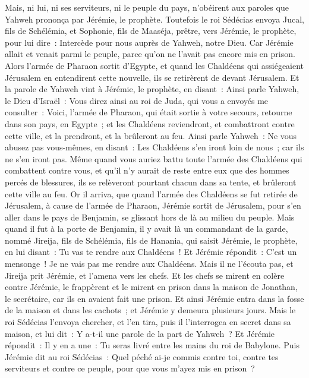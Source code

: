 \begin{multicols}{2}
Mais, ni lui, ni ses serviteurs, ni le peuple du pays, n'obéirent aux paroles que Yahweh prononça par Jérémie, le prophète.
Toutefois le roi Sédécias envoya Jucal, fils de Schélémia, et Sophonie, fils de Maaséja, prêtre, vers Jérémie, le prophète, pour lui dire~: Intercède pour nous auprès de Yahweh, notre Dieu.
Car Jérémie allait et venait parmi le peuple, parce qu'on ne l'avait pas encore mis en prison.
Alors l'armée de Pharaon sortit d'Egypte, et quand les Chaldéens qui assiégeaient Jérusalem en entendirent cette nouvelle, ils se retirèrent de devant Jérusalem.
Et la parole de Yahweh vint à Jérémie, le prophète, en disant~:
Ainsi parle Yahweh, le Dieu d'Israël~: Vous direz ainsi au roi de Juda, qui vous a envoyés me consulter~: Voici, l'armée de Pharaon, qui était sortie à votre secours, retourne dans son pays, en Egypte~;
et les Chaldéens reviendront, et combattront contre cette ville, et la prendront, et la brûleront au feu.
Ainsi parle Yahweh~: Ne vous abusez pas vous-mêmes, en disant~: Les Chaldéens s'en iront loin de nous~; car ils ne s'en iront pas.
Même quand vous auriez battu toute l'armée des Chaldéens qui combattent contre vous, et qu'il n'y aurait de reste entre eux que des hommes percés de blessures, ils se relèveront pourtant chacun dans sa tente, et brûleront cette ville au feu.
Or il arriva, que quand l'armée des Chaldéens se fut retirée de Jérusalem, à cause de l'armée de Pharaon,
Jérémie sortit de Jérusalem, pour s'en aller dans le pays de Benjamin, se glissant hors de là au milieu du peuple.
Mais quand il fut à la porte de Benjamin, il y avait là un commandant de la garde, nommé Jireija, fils de Schélémia, fils de Hanania, qui saisit Jérémie, le prophète, en lui disant~: Tu vas te rendre aux Chaldéens~!
Et Jérémie répondit~: C'est un mensonge~! Je ne vais pas me rendre aux Chaldéens. Mais il ne l'écouta pas, et Jireija prit Jérémie, et l'amena vers les chefs.
Et les chefs se mirent en colère contre Jérémie, le frappèrent et le mirent en prison dans la maison de Jonathan, le secrétaire, car ils en avaient fait une prison.
Et ainsi Jérémie entra dans la fosse de la maison et dans les cachots~; et Jérémie y demeura plusieurs jours.
Mais le roi Sédécias l'envoya chercher, et l'en tira, puis il l'interrogea en secret dans sa maison, et lui dit~: Y a-t-il une parole de la part de Yahweh~? Et Jérémie répondit~: Il y en a une~: Tu seras livré entre les mains du roi de Babylone.
Puis Jérémie dit au roi Sédécias~: Quel péché ai-je commis contre toi, contre tes serviteurs et contre ce peuple, pour que vous m'ayez mis en prison~?

\end{multicols}
